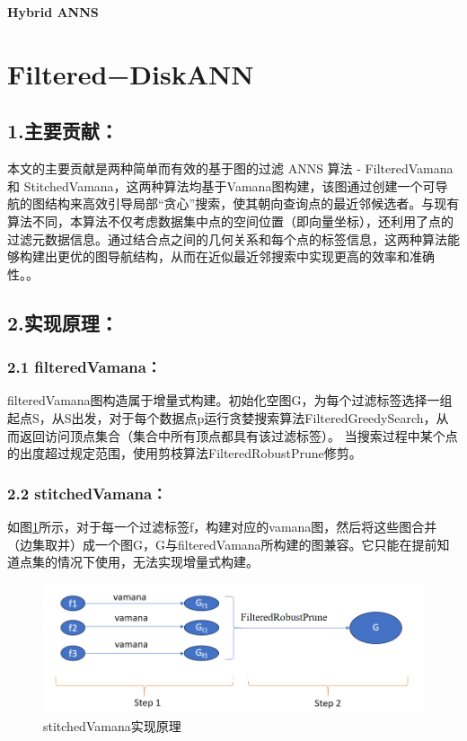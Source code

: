 \documentclass[12pt,UTF8,AutoFakeBold=2,a4paper]{ctexart} %
\newcommand{\sanhao}{\fontsize{16pt}{\baselineskip}\selectfont}
\newcommand{\sihao}{\fontsize{14pt}{\baselineskip}\selectfont}
\begin{document}
\begin{center}
{\sanhao \kaishu \bfseries  Hybrid ANNS }
\end{center}

\section{Filtered−DiskANN}
\subsection{1.主要贡献：}
{\sihao \kaishu 本文的主要贡献是两种简单而有效的基于图的过滤 ANNS 算法 - FilteredVamana 和 StitchedVamana，这两种算法均基于Vamana图构建，该图通过创建一个可导航的图结构来高效引导局部“贪心”搜索，使其朝向查询点的最近邻候选者。与现有算法不同，本算法不仅考虑数据集中点的空间位置（即向量坐标），还利用了点的过滤元数据信息。通过结合点之间的几何关系和每个点的标签信息，这两种算法能够构建出更优的图导航结构，从而在近似最近邻搜索中实现更高的效率和准确性。。}

\subsection{2.实现原理：}
\subsubsection{2.1 filteredVamana：}
{\sihao \kaishu filteredVamana图构造属于增量式构建。初始化空图G，为每个过滤标签选择一组起点S，从S出发，对于每个数据点p运行贪婪搜索算法FilteredGreedySearch，从而返回访问顶点集合（集合中所有顶点都具有该过滤标签）。}
{\sihao \kaishu 当搜索过程中某个点的出度超过规定范围，使用剪枝算法FilteredRobustPrune修剪。 }


\subsubsection{2.2 stitchedVamana：}
{\sihao \kaishu 如图\ref{fig:1}所示，对于每一个过滤标签f，构建对应的vamana图，然后将这些图合并（边集取并）成一个图G，G与filteredVamana所构建的图兼容。它只能在提前知道点集的情况下使用，无法实现增量式构建。}
\begin{figure}[!th]
\begin{center}
\includegraphics[width=5in]{stitchedvamana.png}
\caption{{\kaishu stitchedVamana实现原理}}
\label{fig:1}
\end{center}
\end{figure}
\end{document}
